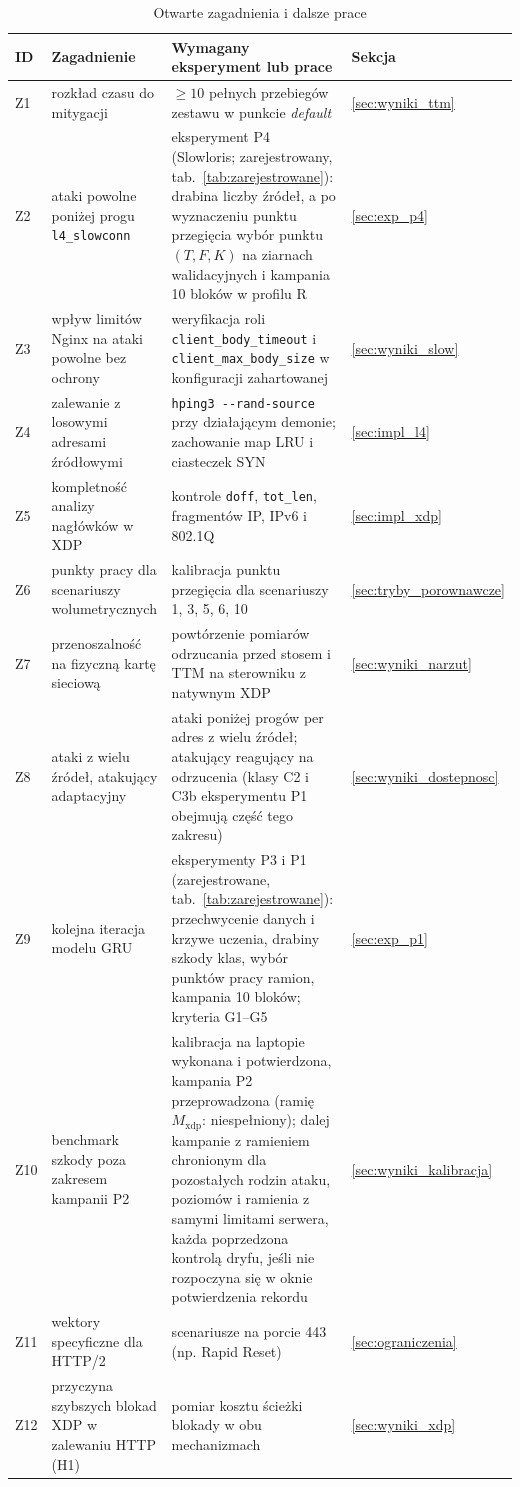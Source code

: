 \documentclass[a4paper,12pt]{article}
\begin{document}
\begin{table}[H]
\centering
\scriptsize
\caption{Otwarte zagadnienia i dalsze prace}\label{tab:plan}
\begin{tabularx}{\linewidth}{@{}L{0.6cm}L{4.0cm}YL{1.7cm}@{}}
\toprule
ID & Zagadnienie & Wymagany eksperyment lub prace & Sekcja \\
\midrule
Z1 & rozkład czasu do mitygacji & $\geq 10$ pełnych przebiegów zestawu w punkcie \textit{default} & \ref{sec:wyniki_ttm} \\
Z2 & ataki powolne poniżej progu \texttt{l4\_slowconn} & eksperyment P4 (Slowloris; zarejestrowany, tab.~\ref{tab:zarejestrowane}): drabina liczby źródeł, a po wyznaczeniu punktu przegięcia wybór punktu $(T, F, K)$ na ziarnach walidacyjnych i kampania 10 bloków w profilu R & \ref{sec:exp_p4} \\
Z3 & wpływ limitów Nginx na ataki powolne bez ochrony & weryfikacja roli \texttt{client\_body\_timeout} i \texttt{client\_max\_body\_size} w konfiguracji zahartowanej & \ref{sec:wyniki_slow} \\
Z4 & zalewanie z losowymi adresami źródłowymi & \texttt{hping3 -{}-rand-source} przy działającym demonie; zachowanie map LRU i ciasteczek SYN & \ref{sec:impl_l4} \\
Z5 & kompletność analizy nagłówków w XDP & kontrole \texttt{doff}, \texttt{tot\_len}, fragmentów IP, IPv6 i 802.1Q & \ref{sec:impl_xdp} \\
Z6 & punkty pracy dla scenariuszy wolumetrycznych & kalibracja punktu przegięcia dla scenariuszy 1, 3, 5, 6, 10 & \ref{sec:tryby_porownawcze} \\
Z7 & przenoszalność na fizyczną kartę sieciową & powtórzenie pomiarów odrzucania przed stosem i TTM na sterowniku z natywnym XDP & \ref{sec:wyniki_narzut} \\
Z8 & ataki z wielu źródeł, atakujący adaptacyjny & ataki poniżej progów per adres z wielu źródeł; atakujący reagujący na odrzucenia (klasy C2 i C3b eksperymentu P1 obejmują część tego zakresu) & \ref{sec:wyniki_dostepnosc} \\
Z9 & kolejna iteracja modelu GRU & eksperymenty P3 i P1 (zarejestrowane, tab.~\ref{tab:zarejestrowane}): przechwycenie danych i krzywe uczenia, drabiny szkody klas, wybór punktów pracy ramion, kampania 10 bloków; kryteria G1--G5 & \ref{sec:exp_p1} \\
Z10 & benchmark szkody poza zakresem kampanii P2 & kalibracja na laptopie wykonana i potwierdzona, kampania P2 przeprowadzona (ramię $M_{\mathrm{xdp}}$: niespełniony); dalej kampanie z ramieniem chronionym dla pozostałych rodzin ataku, poziomów i ramienia z samymi limitami serwera, każda poprzedzona kontrolą dryfu, jeśli nie rozpoczyna się w oknie potwierdzenia rekordu & \ref{sec:wyniki_kalibracja} \\
Z11 & wektory specyficzne dla HTTP/2 & scenariusze na porcie 443 (np. Rapid Reset) & \ref{sec:ograniczenia} \\
Z12 & przyczyna szybszych blokad XDP w zalewaniu HTTP (H1) & pomiar kosztu ścieżki blokady w obu mechanizmach & \ref{sec:wyniki_xdp} \\
\bottomrule
\end{tabularx}
\end{table}
\end{document}

